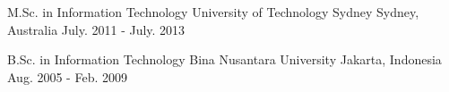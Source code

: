 

\begin{cventries}

  \cventry
    {M.Sc. in Information Technology} %
    {University of Technology Sydney} %
    {Sydney, Australia} %
    {July. 2011 - July. 2013} %
    {
      \begin{cvitems} %
      \end{cvitems}
    }

  \cventry
    {B.Sc. in Information Technology} %
    {Bina Nusantara University} %
    {Jakarta, Indonesia} %
    {Aug. 2005 - Feb. 2009} %
    {
      \begin{cvitems} %
      \end{cvitems}
    }

\end{cventries}
